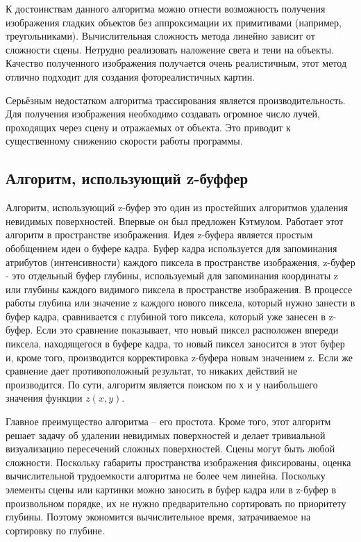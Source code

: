 К достоинствам данного алгоритма можно отнести возможность получения изображения гладких объектов без аппроксимации их примитивами (например, треугольниками). Вычислительная сложность метода линейно зависит от сложности сцены. Нетрудно реализовать наложение света и тени на объекты. Качество полученного изображения получается очень реалистичным, этот метод отлично подходит для создания фотореалистичных картин.

Серьёзным недостатком алгоритма трассирования является производительность. Для получения изображения необходимо создавать огромное число лучей, проходящих через сцену и отражаемых от объекта. Это приводит к существенному снижению скорости работы программы.

\subsection{Алгоритм, использующий z-буффер}
Алгоритм, использующий z-буфер это один из простейших алгоритмов удаления невидимых поверхностей. Впервые он был предложен Кэтмулом. Работает этот алгоритм в пространстве изображения. Идея z-буфера является простым обобщением идеи о буфере кадра. Буфер кадра используется для запоминания атрибутов (интенсивности) каждого пиксела в пространстве изображения, z-буфер - это отдельный буфер глубины, используемый для запоминания координаты z или глубины каждого видимого пиксела в пространстве изображения. В процессе работы глубина или значение z каждого нового пиксела, который нужно занести в буфер кадра, сравнивается с глубиной того пиксела, который уже занесен в z-буфер. Если это сравнение показывает, что новый пиксел расположен впереди пиксела, находящегося в буфере кадра, то новый пиксел заносится в этот буфер и, кроме того, производится корректировка z-буфера новым значением z. Если же сравнение дает противоположный результат, то никаких действий не производится. По сути, алгоритм является поиском по х и у наибольшего значения функции \(z(x,y)\).

Главное преимущество алгоритма – его простота. Кроме того, этот алгоритм решает задачу об удалении невидимых поверхностей и делает тривиальной визуализацию пересечений сложных поверхностей. Сцены могут быть любой сложности. Поскольку габариты пространства изображения фиксированы, оценка вычислительной трудоемкости алгоритма не более чем линейна. Поскольку элементы сцены или картинки можно заносить в буфер кадра или в z-буфер в произвольном порядке, их не нужно предварительно сортировать по приоритету глубины. Поэтому экономится вычислительное время, затрачиваемое на сортировку по глубине.

